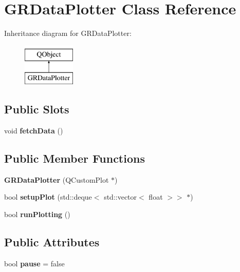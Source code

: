 \hypertarget{classGRDataPlotter}{}\section{G\+R\+Data\+Plotter Class Reference}
\label{classGRDataPlotter}
Inheritance diagram for G\+R\+Data\+Plotter\+:\begin{figure}[H]
\begin{center}
\leavevmode
\includegraphics[height=2.000000cm]{classGRDataPlotter}
\end{center}
\end{figure}
\subsection*{Public Slots}
\begin{DoxyCompactItemize}
\item 
\mbox{\label{classGRDataPlotter_a469fd2eb134870c2eaa0db9e72b22554}} 
void {\bfseries fetch\+Data} ()
\end{DoxyCompactItemize}
\subsection*{Public Member Functions}
\begin{DoxyCompactItemize}
\item 
\mbox{\label{classGRDataPlotter_a1fab7824faf0cc3e30f3b0d00c102df5}} 
{\bfseries G\+R\+Data\+Plotter} (Q\+Custom\+Plot $\ast$)
\item 
\mbox{\label{classGRDataPlotter_ad2f61394825de7a649d96530ad58554b}} 
bool {\bfseries setup\+Plot} (std\+::deque$<$ std\+::vector$<$ float $>$$>$ $\ast$)
\item 
\mbox{\label{classGRDataPlotter_a1198103d772e1867a106700bfef2304e}} 
bool {\bfseries run\+Plotting} ()
\end{DoxyCompactItemize}
\subsection*{Public Attributes}
\begin{DoxyCompactItemize}
\item 
\mbox{\label{classGRDataPlotter_ac79b65e13a8de47b9b25c5b6df7ba603}} 
bool {\bfseries pause} = false
\end{DoxyCompactItemize}


